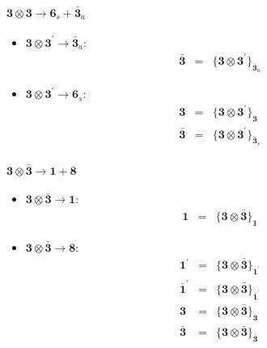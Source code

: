 \documentclass[english]{article}
\newcommand{\subcg}[3]{\big\{ {#1}\otimes{#2}\big\}^{}_{#3}}
\newcommand{\rep}[1]{\mathbf{#1}}
\begin{document}
\paragraph*{\Large $\rep{3}\otimes\rep{3}\to\rep{6}_s+\rep{\bar{3}}_a$}
\begin{itemize}
\item $\rep{3}\otimes\rep{3^{\prime}}\to\rep{\bar{3}}_{a}$:
\begin{eqnarray*}
\rep{\bar{3}} &=& \subcg{\rep{3}}{\rep{3^{\prime}}}{\rep{\bar{3}}_{a}}
\end{eqnarray*}
\item $\rep{3}\otimes\rep{3^{\prime}}\to\rep{6}_{s}$:
\begin{eqnarray*}
\rep{3} &=& \subcg{\rep{3}}{\rep{3^{\prime}}}{\rep{3}}
\\
\rep{\bar{3}} &=& \subcg{\rep{3}}{\rep{3^{\prime}}}{\rep{\bar{3}}_{s}}
\end{eqnarray*}
\end{itemize}
\paragraph*{\Large $\rep{3}\otimes\rep{\bar{3}}\to\rep{1}+\rep{8}$}
\begin{itemize}
\item $\rep{3}\otimes\rep{\bar{3}}\to\rep{1}$:
\begin{eqnarray*}
\rep{1} &=& \subcg{\rep{3}}{\rep{\bar{3}}}{\rep{1}}
\end{eqnarray*}
\item $\rep{3}\otimes\rep{\bar{3}}\to\rep{8}$:
\begin{eqnarray*}
\rep{1^{\prime}} &=& \subcg{\rep{3}}{\rep{\bar{3}}}{\rep{1^{\prime}}}
\\
\rep{\bar{1}^{\prime}} &=& \subcg{\rep{3}}{\rep{\bar{3}}}{\rep{\bar{1}^{\prime}}}
\\
\rep{3} &=& \subcg{\rep{3}}{\rep{\bar{3}}}{\rep{3}}
\\
\rep{\bar{3}} &=& \subcg{\rep{3}}{\rep{\bar{3}}}{\rep{\bar{3}}}
\end{eqnarray*}
\end{itemize}
\end{document}
